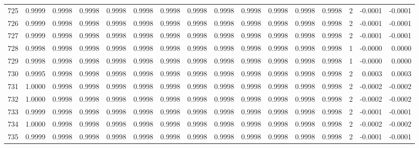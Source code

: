 \begin{tabular}{lrrrrrrrrrrrrrrr}
725 &      0.9999 &  0.9998 &  0.9998 &  0.9998 &  0.9998 &  0.9998 &  0.9998 &  0.9998 &  0.9998 &  0.9998 &   0.9998 &     0.9998 &      2 &                   -0.0001 &                    -0.0001 \\
726 &      0.9999 &  0.9998 &  0.9998 &  0.9998 &  0.9998 &  0.9998 &  0.9998 &  0.9998 &  0.9998 &  0.9998 &   0.9998 &     0.9998 &      2 &                   -0.0001 &                    -0.0001 \\
727 &      0.9999 &  0.9998 &  0.9998 &  0.9998 &  0.9998 &  0.9998 &  0.9998 &  0.9998 &  0.9998 &  0.9998 &   0.9998 &     0.9998 &      2 &                   -0.0001 &                    -0.0001 \\
728 &      0.9998 &  0.9998 &  0.9998 &  0.9998 &  0.9998 &  0.9998 &  0.9998 &  0.9998 &  0.9998 &  0.9998 &   0.9998 &     0.9998 &      1 &                   -0.0000 &                     0.0000 \\
729 &      0.9998 &  0.9998 &  0.9998 &  0.9998 &  0.9998 &  0.9998 &  0.9998 &  0.9998 &  0.9998 &  0.9998 &   0.9998 &     0.9998 &      1 &                   -0.0000 &                     0.0000 \\
730 &      0.9995 &  0.9998 &  0.9998 &  0.9998 &  0.9998 &  0.9998 &  0.9998 &  0.9998 &  0.9998 &  0.9998 &   0.9998 &     0.9998 &      2 &                    0.0003 &                     0.0003 \\
731 &      1.0000 &  0.9998 &  0.9998 &  0.9998 &  0.9998 &  0.9998 &  0.9998 &  0.9998 &  0.9998 &  0.9998 &   0.9998 &     0.9998 &      2 &                   -0.0002 &                    -0.0002 \\
732 &      1.0000 &  0.9998 &  0.9998 &  0.9998 &  0.9998 &  0.9998 &  0.9998 &  0.9998 &  0.9998 &  0.9998 &   0.9998 &     0.9998 &      2 &                   -0.0002 &                    -0.0002 \\
733 &      0.9999 &  0.9998 &  0.9998 &  0.9998 &  0.9998 &  0.9998 &  0.9998 &  0.9998 &  0.9998 &  0.9998 &   0.9998 &     0.9998 &      2 &                   -0.0001 &                    -0.0001 \\
734 &      1.0000 &  0.9998 &  0.9998 &  0.9998 &  0.9998 &  0.9998 &  0.9998 &  0.9998 &  0.9998 &  0.9998 &   0.9998 &     0.9998 &      2 &                   -0.0002 &                    -0.0002 \\
735 &      0.9999 &  0.9998 &  0.9998 &  0.9998 &  0.9998 &  0.9998 &  0.9998 &  0.9998 &  0.9998 &  0.9998 &   0.9998 &     0.9998 &      2 &                   -0.0001 &                    -0.0001 \\

\end{tabular}
